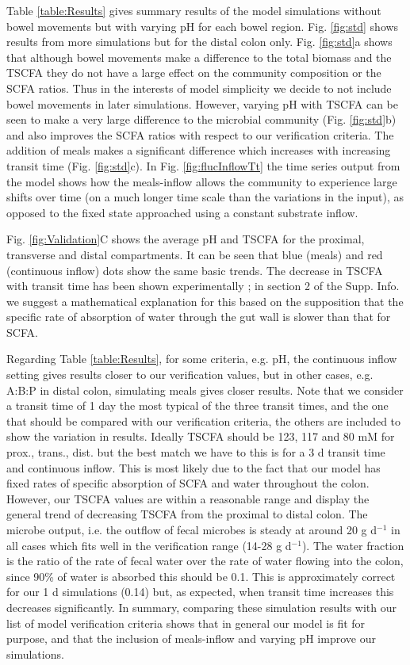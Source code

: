 \documentclass[a4paper]{article}
\begin{document}
Table \ref{table:Results} gives summary results of the model simulations without bowel movements but with varying pH for each bowel region. Fig. \ref{fig:std} shows results from more simulations but for the distal colon only.
Fig. \ref{fig:std}a shows that although bowel movements make a difference to the total biomass and the TSCFA they do not have a large effect on the community composition or the SCFA ratios. Thus in the interests of model simplicity we decide to not include bowel movements in later simulations.
However, varying pH with TSCFA can be seen to make a very large difference to the microbial community (Fig. \ref{fig:std}b) and also improves the SCFA ratios with respect to our verification criteria.
The addition of meals makes a significant difference which increases with increasing transit time (Fig. \ref{fig:std}c). 
In Fig. \ref{fig:flucInflowTt} the time series output from the model shows how the meals-inflow allows the community to experience large shifts over time (on a much longer time scale than the variations in the input), as opposed to the fixed state approached using a constant substrate inflow.

Fig. \ref{fig:Validation}C shows the average pH and TSCFA for the proximal, transverse and distal compartments. It can be seen that blue (meals) and red (continuous inflow) dots show the same basic trends.
The decrease in TSCFA with transit time has been shown experimentally \citep{Lewis}; in section 2 of the Supp. Info. we suggest a mathematical explanation for this based on the supposition that the specific rate of absorption of water through the gut wall is slower than that for SCFA.


Regarding Table \ref{table:Results}, for some criteria, e.g. pH, the continuous inflow setting gives results closer to our verification values, but in other cases, e.g. A:B:P in distal colon, simulating meals gives closer results. 
Note that we consider a transit time of 1 day the most typical of the three transit times, and the one that should be compared with our verification criteria, the others are included to show the variation in results.
Ideally TSCFA should be 123, 117 and 80 mM for prox., trans., dist. but the best match we have to this is for a 3 d transit time and continuous inflow. 
This is most likely due to the fact that our model has fixed rates of specific absorption of SCFA and water throughout the colon.
However, our TSCFA values are within a reasonable range and display the general trend of decreasing TSCFA from the proximal to distal colon.
The microbe output, i.e. the outflow of fecal microbes is steady at around 20 g d$^{-1}$ in all cases which fits well in the verification range (14-28 g d$^{-1}$).
The water fraction is the ratio of the rate of fecal water over the rate of water flowing into the colon, since 90\% of water is absorbed this should be 0.1. This is approximately correct for our 1 d simulations (0.14) but, as expected, when transit time increases this decreases significantly.
In summary, comparing these simulation results with our list of model verification criteria shows that in general our model is fit for purpose, and that the inclusion of meals-inflow and varying pH improve our simulations. 
\end{document}
